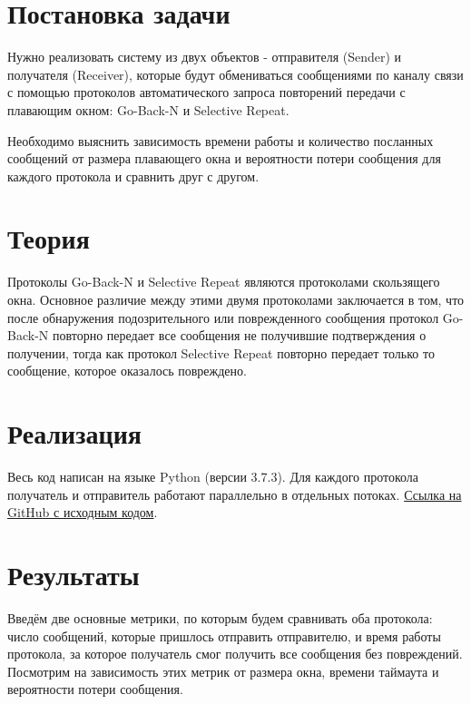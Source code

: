 \documentclass[a4paper,12pt]{article}
\begin{document}
    
    \newpage

    \tableofcontents
    \listoffigures
    \newpage

    \section{Постановка задачи}
    \quad Нужно реализовать систему из двух объектов - отправителя (Sender) и получателя (Receiver),
    которые будут обмениваться сообщениями по каналу связи с помощью протоколов автоматического запроса повторений передачи
    с плавающим окном: Go-Back-N и Selective Repeat.

    Необходимо выяснить зависимость времени работы и количество посланных сообщений от размера плавающего окна 
    и вероятности потери сообщения для каждого протокола и сравнить друг с другом.

    \section{Теория} \label{s:theory}
    \quad Протоколы Go-Back-N и Selective Repeat являются протоколами скользящего окна.
    Основное различие между этими двумя протоколами заключается в том, что после обнаружения подозрительного или поврежденного сообщения
    протокол Go-Back-N повторно передает все сообщения не получившие подтверждения о получении,
    тогда как протокол Selective Repeat повторно передает только то сообщение, которое оказалось повреждено.

    \section{Реализация}
    \quad Весь код написан на языке Python (версии 3.7.3).
    Для каждого протокола получатель и отправитель работают параллельно в отдельных потоках.
    \href{https://github.com/kirillkuks/Networks/tree/master/lab1}{Ссылка на GitHub с исходным кодом}.

    \section{Результаты}
    \quad Введём две основные метрики, по которым будем сравнивать оба протокола:
    число сообщений, которые пришлось отправить отправителю, 
    и время работы протокола, за которое получатель смог получить все сообщения без повреждений.
    Посмотрим на зависимость этих метрик от 
    размера окна, времени таймаута и вероятности потери сообщения.
    
\end{document}
